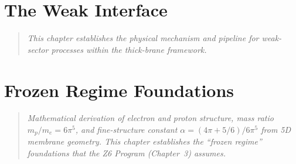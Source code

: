 \documentclass[11pt,a4paper]{book}
\theoremstyle{definition}
\theoremstyle{remark}
\begin{document}
\mainmatter

\chapter{The Weak Interface}
\label{ch:weak_interface}

\begin{quote}
\textit{This chapter establishes the physical mechanism and pipeline for weak-sector
processes within the thick-brane framework.}
\end{quote}



















\chapter{Frozen Regime Foundations}
\label{ch:frozen_regime}

\begin{quote}
\textit{Mathematical derivation of electron and proton structure, mass ratio $m_p/m_e = 6\pi^5$,
and fine-structure constant $\alpha = (4\pi + 5/6)/6\pi^5$ from 5D membrane geometry.
This chapter establishes the ``frozen regime'' foundations that the Z6 Program (Chapter~3) assumes.}
\end{quote}



\end{document}
